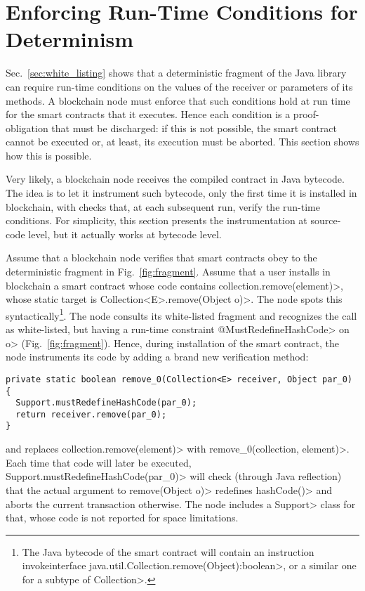 \section{Enforcing Run-Time Conditions for Determinism}\label{sec:enforcing}

Sec.~\ref{sec:white_listing} shows that a deterministic fragment of the Java library
can require run-time conditions on the values of the receiver or
parameters of its methods. A blockchain node must enforce that such conditions hold
at run time for the smart contracts that it executes. Hence each condition
is a proof-obligation that must be discharged: if this is not possible, the smart contract
cannot be executed or, at least, its execution must be aborted. This section shows how
this is possible.

Very likely, a blockchain node receives the compiled contract in Java bytecode.
The idea is to let it instrument such bytecode, only the first time it is installed in blockchain,
with checks that, at each subsequent run, verify the run-time conditions.
For simplicity, this section presents
the instrumentation at source-code level, but it actually works at bytecode level.

Assume that a blockchain node verifies that smart contracts obey to the deterministic
fragment in Fig.~\ref{fig:fragment}.
Assume that a user installs in blockchain a smart contract whose
code contains \<collection.remove(element)>, whose static target is
\<Collection$\text{<}$E$\text{>}$.remove(Object o)>.
The node spots this syntactically\footnote{The Java bytecode of the
  smart contract will
  contain an instruction \<invokeinterface java.util.Collection.remove(Object):boolean>,
  or a similar one for a subtype of \<Collection>.}.
The node consults its white-listed fragment and recognizes the call as
white-listed, but having a run-time constraint \<@MustRedefineHashCode> on \<o>
(Fig.~\ref{fig:fragment}). Hence, during installation of the
smart contract, the node instruments its code by adding a brand new
verification method:

{\small\begin{verbatim}
private static boolean remove_0(Collection<E> receiver, Object par_0) {
  Support.mustRedefineHashCode(par_0);
  return receiver.remove(par_0);
}
\end{verbatim}}

\noindent
and replaces \<collection.remove(element)> with \<remove\_0(collection, element)>.
Each time that code will later be executed,
\<Support.mustRedefineHashCode(par\_0)> will check (through Java reflection)
that the actual argument
to \<remove(Object o)> redefines \<hashCode()> and aborts
the current transaction otherwise. The node includes a
\<Support> class for that, whose
code is not reported for space limitations.

